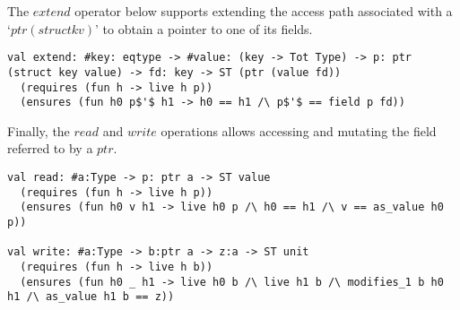 The \lst$extend$ operator below supports extending the access path
associated with a `\lst$ptr (struct k v)$' to obtain a pointer to one of
its fields.

\begin{lstlisting}[numbers=none]
val extend: #key: eqtype -> #value: (key -> Tot Type) -> p: ptr (struct key value) -> fd: key -> ST (ptr (value fd))
  (requires (fun h -> live h p))
  (ensures (fun h0 p$'$ h1 -> h0 == h1 /\ p$'$ == field p fd))
\end{lstlisting}

Finally, the \lst$read$ and \lst$write$ operations allows accessing and
mutating the field referred to by a \lst$ptr$.

\begin{lstlisting}[numbers=none]
val read: #a:Type -> p: ptr a -> ST value
  (requires (fun h -> live h p))
  (ensures (fun h0 v h1 -> live h0 p /\ h0 == h1 /\ v == as_value h0 p))

val write: #a:Type -> b:ptr a -> z:a -> ST unit
  (requires (fun h -> live h b))
  (ensures (fun h0 _ h1 -> live h0 b /\ live h1 b /\ modifies_1 b h0 h1 /\ as_value h1 b == z))
\end{lstlisting}







